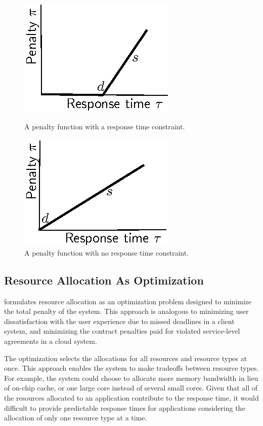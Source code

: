 \begin{figure}[hb]
\parbox{1.6in}{
\includegraphics*{Penalty1.eps}
\caption{\label{f:pen1}A penalty function with a response time constraint.}
}
\hspace{\fill}
\parbox{1.6in}{
\includegraphics*{Penalty2.eps}
\caption{\label{f:pen2}A penalty function with no response time constraint.}
}
\end{figure}

\subsection{Resource Allocation As Optimization}

\pacora formulates resource allocation as an optimization problem
designed to minimize the total penalty of the system. This approach is
analogous to minimizing user dissatisfaction with the user experience
due to missed deadlines in a client system, and minimizing the contract
penalties paid for violated service-level agreements in a cloud
system.

The optimization selects the allocations for all resources and
resource types at once.  This approach enables the system to make
tradeoffs between resource types.  For example, the system could
choose to allocate more memory bandwidth in lieu of on-chip cache, or
one large core instead of several small cores.  Given that all of the
resources allocated to an application contribute to the response time,
it would difficult to provide predictable response times for
applications considering the allocation of only one resource type at a
time.

